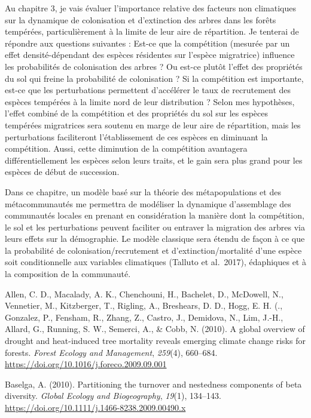 \documentclass[
]{article}
\begin{document}
Au chapitre 3, je vais évaluer l'importance relative des facteurs non
climatiques sur la dynamique de colonisation et d'extinction des arbres
dans les forêts tempérées, particulièrement à la limite de leur aire de
répartition. Je tenterai de répondre aux questions suivantes : Est-ce
que la compétition (mesurée par un effet densité-dépendant des espèces
résidentes sur l'espèce migratrice) influence les probabilités de
colonisation des arbres ? Ou est-ce plutôt l'effet des propriétés du sol
qui freine la probabilité de colonisation ? Si la compétition est
importante, est-ce que les perturbations permettent d'accélérer le taux
de recrutement des espèces tempérées à la limite nord de leur
distribution ? Selon mes hypothèses, l'effet combiné de la compétition
et des propriétés du sol sur les espèces tempérées migratrices sera
soutenu en marge de leur aire de répartition, mais les perturbations
faciliteront l'établissement de ces espèces en diminuant la compétition.
Aussi, cette diminution de la compétition avantagera différentiellement
les espèces selon leurs traits, et le gain sera plus grand pour les
espèces de début de succession.

Dans ce chapitre, un modèle basé sur la théorie des métapopulations et
des métacommunautés me permettra de modéliser la dynamique d'assemblage
des communautés locales en prenant en considération la manière dont la
compétition, le sol et les perturbations peuvent faciliter ou entraver
la migration des arbres via leurs effets sur la démographie. Le modèle
classique sera étendu de façon à ce que la probabilité de
colonisation/recrutement et d'extinction/mortalité d'une espèce soit
conditionnelle aux variables climatiques (Talluto et al.~2017),
édaphiques et à la composition de la communauté.

\hypertarget{refs}{}
\leavevmode\hypertarget{ref-allen_global_2010}{}%
Allen, C. D., Macalady, A. K., Chenchouni, H., Bachelet, D., McDowell,
N., Vennetier, M., Kitzberger, T., Rigling, A., Breshears, D. D., Hogg,
E. H. (., Gonzalez, P., Fensham, R., Zhang, Z., Castro, J., Demidova,
N., Lim, J.-H., Allard, G., Running, S. W., Semerci, A., \& Cobb, N.
(2010). A global overview of drought and heat-induced tree mortality
reveals emerging climate change risks for forests. \emph{Forest Ecology
and Management}, \emph{259}(4), 660--684.
\url{https://doi.org/10.1016/j.foreco.2009.09.001}

\leavevmode\hypertarget{ref-baselga_partitioning_2010}{}%
Baselga, A. (2010). Partitioning the turnover and nestedness components
of beta diversity. \emph{Global Ecology and Biogeography}, \emph{19}(1),
134--143. \url{https://doi.org/10.1111/j.1466-8238.2009.00490.x}
\end{document}
